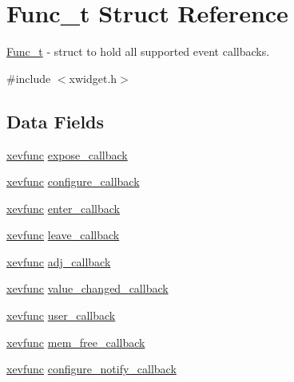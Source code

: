 \hypertarget{structFunc__t}{}\section{Func\+\_\+t Struct Reference}
\label{structFunc__t}


\hyperlink{structFunc__t}{Func\+\_\+t} -\/ struct to hold all supported event callbacks.  




{\ttfamily \#include $<$xwidget.\+h$>$}

\subsection*{Data Fields}
\begin{DoxyCompactItemize}
\item 
\hyperlink{xwidget_8h_a9ef0263424a7f5f8f6b02055fca67ddd}{xevfunc} \hyperlink{structFunc__t_ae4ba307ec29bfea83e1197aa750c1396}{expose\+\_\+callback}
\item 
\hyperlink{xwidget_8h_a9ef0263424a7f5f8f6b02055fca67ddd}{xevfunc} \hyperlink{structFunc__t_a7876670d3bb74b11ab93fe81908d04b0}{configure\+\_\+callback}
\item 
\hyperlink{xwidget_8h_a9ef0263424a7f5f8f6b02055fca67ddd}{xevfunc} \hyperlink{structFunc__t_a6ae24f219bf8eff4bd5fbdfa3f29c14d}{enter\+\_\+callback}
\item 
\hyperlink{xwidget_8h_a9ef0263424a7f5f8f6b02055fca67ddd}{xevfunc} \hyperlink{structFunc__t_a1801ba902bd7efc706d474312f960d0a}{leave\+\_\+callback}
\item 
\hyperlink{xwidget_8h_a9ef0263424a7f5f8f6b02055fca67ddd}{xevfunc} \hyperlink{structFunc__t_afe804d94b970050a9f85530408169623}{adj\+\_\+callback}
\item 
\hyperlink{xwidget_8h_a9ef0263424a7f5f8f6b02055fca67ddd}{xevfunc} \hyperlink{structFunc__t_acce396ccf3266886f0a6d28cf45761d3}{value\+\_\+changed\+\_\+callback}
\item 
\hyperlink{xwidget_8h_a9ef0263424a7f5f8f6b02055fca67ddd}{xevfunc} \hyperlink{structFunc__t_a1f089cb13a39764a1f980470a51db71b}{user\+\_\+callback}
\item 
\hyperlink{xwidget_8h_a9ef0263424a7f5f8f6b02055fca67ddd}{xevfunc} \hyperlink{structFunc__t_ac0a05a827a9cb6469cb15e7225411f16}{mem\+\_\+free\+\_\+callback}
\item 
\hyperlink{xwidget_8h_a9ef0263424a7f5f8f6b02055fca67ddd}{xevfunc} \hyperlink{structFunc__t_a63a27e3f238d08a6ca4b47b99ae04df9}{configure\+\_\+notify\+\_\+callback}

\end{DoxyCompactItemize}
